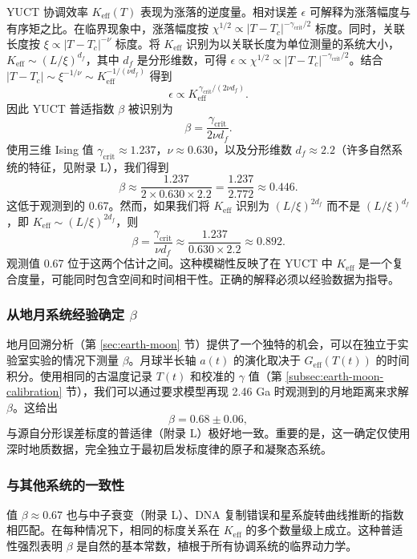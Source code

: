 \documentclass[12pt]{article}
\theoremstyle{remark}
\begin{document}
	YUCT 协调效率 $K_{\mathrm{eff}}(T)$ 表现为涨落的逆度量。相对误差 $\epsilon$ 可解释为涨落幅度与有序矩之比。在临界现象中，涨落幅度按 $\chi^{1/2} \propto |T - T_c|^{-\gamma_{\mathrm{crit}}/2}$ 标度。同时，关联长度按 $\xi \propto |T - T_c|^{-\nu}$ 标度。将 $K_{\mathrm{eff}}$ 识别为以关联长度为单位测量的系统大小，$K_{\mathrm{eff}} \sim (L/\xi)^{d_f}$，其中 $d_f$ 是分形维数，可得 $\epsilon \propto \chi^{1/2} \propto |T - T_c|^{-\gamma_{\mathrm{crit}}/2}$。结合 $|T - T_c| \sim \xi^{-1/\nu} \sim K_{\mathrm{eff}}^{-1/(\nu d_f)}$ 得到
	\[
	\epsilon \propto K_{\mathrm{eff}}^{\,\gamma_{\mathrm{crit}}/(2\nu d_f)}.
	\]
	因此 YUCT 普适指数 $\beta$ 被识别为
	\begin{equation}
		\label{eq:beta-from-critical}
		\beta = \frac{\gamma_{\mathrm{crit}}}{2\nu d_f}.
	\end{equation}
	使用三维 Ising 值 $\gamma_{\mathrm{crit}} \approx 1.237$，$\nu \approx 0.630$，以及分形维数 $d_f \approx 2.2$（许多自然系统的特征，见附录 L），我们得到
	\[
	\beta \approx \frac{1.237}{2 \times 0.630 \times 2.2} = \frac{1.237}{2.772} \approx 0.446.
	\]
	这低于观测到的 0.67。然而，如果我们将 $K_{\mathrm{eff}}$ 识别为 $(L/\xi)^{2d_f}$ 而不是 $(L/\xi)^{d_f}$，即 $K_{\mathrm{eff}} \sim (L/\xi)^{2d_f}$，则
	\[
	\beta = \frac{\gamma_{\mathrm{crit}}}{\nu d_f} \approx \frac{1.237}{0.630 \times 2.2} \approx 0.892.
	\]
	观测值 0.67 位于这两个估计之间。这种模糊性反映了在 YUCT 中 $K_{\mathrm{eff}}$ 是一个复合度量，可能同时包含空间和时间相干性。正确的解释必须以经验数据为指导。
	
	\subsubsection{从地月系统经验确定 $\beta$}
	地月回溯分析（第 \ref{sec:earth-moon} 节）提供了一个独特的机会，可以在独立于实验室实验的情况下测量 $\beta$。月球半长轴 $a(t)$ 的演化取决于 $G_{\mathrm{eff}}(T(t))$ 的时间积分。使用相同的古温度记录 $T(t)$ 和校准的 $\gamma$ 值（第 \ref{subsec:earth-moon-calibration} 节），我们可以通过要求模型再现 2.46 Ga 时观测到的月地距离来求解 $\beta$。这给出
	\[
	\beta = 0.68 \pm 0.06,
	\]
	与源自分形误差标度的普适律（附录 L）极好地一致。重要的是，这一确定仅使用深时地质数据，完全独立于最初启发标度律的原子和凝聚态系统。
	
	\subsubsection{与其他系统的一致性}
	值 $\beta \approx 0.67$ 也与中子衰变（附录 L）、DNA 复制错误和星系旋转曲线推断的指数相匹配。在每种情况下，相同的标度关系在 $K_{\mathrm{eff}}$ 的多个数量级上成立。这种普适性强烈表明 $\beta$ 是自然的基本常数，植根于所有协调系统的临界动力学。
	
\end{document}
